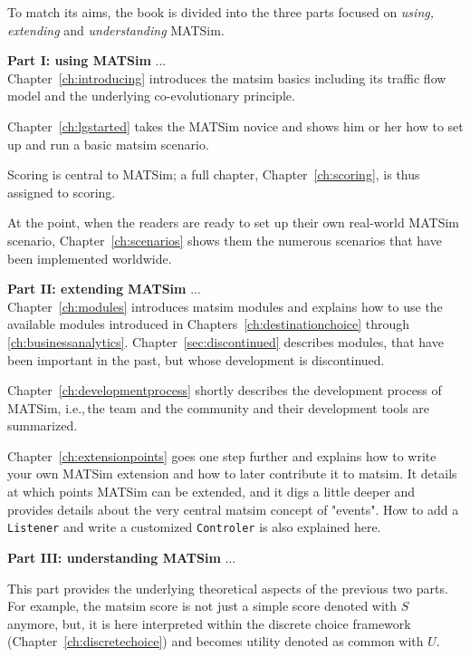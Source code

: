 To match its aims, the book is divided into the three parts focused on \emph{using, extending} and \emph{understanding} MATSim. 

\textbf{Part I: using MATSim} ... \\
Chapter~\ref{ch:introducing} introduces the \gls{matsim} basics including its traffic flow model and the underlying co-evolutionary principle. 

Chapter~\ref{ch:lgstarted} takes the MATSim novice and shows him or her how to set up and run a basic \gls{matsim} scenario. 

Scoring is central to MATSim; a full chapter, Chapter~\ref{ch:scoring}, is thus assigned to scoring. 

At the point, when the readers are ready to set up their own real-world MATSim \gls{scenario}, Chapter~\ref{ch:scenarios} shows them the numerous scenarios that have been implemented worldwide. 

\textbf{Part II: extending MATSim} ... \\
Chapter~\ref{ch:modules} introduces \gls{matsim} modules and explains how to use the available modules introduced in Chapters~\ref{ch:destinationchoice} through \ref{ch:businessanalytics}. Chapter~\ref{sec:discontinued} describes modules, that have been important in the past, but whose development is discontinued.

Chapter~\ref{ch:developmentprocess} shortly describes the development process of MATSim, i.e.,\,the team and the community and their development tools are summarized. 

Chapter~\ref{ch:extensionpoints} goes one step further and explains how to write your own MATSim extension and how to later contribute it to \gls{matsim}. It details at which points MATSim can be extended, and it digs a little deeper and provides details about the very central \gls{matsim} concept of "events". How to add a \lstinline|Listener| and write a customized \lstinline|Controler| is also explained here.

\textbf{Part III: understanding MATSim} ... \\


This part provides the underlying theoretical aspects of the previous two parts. For example, the \gls{matsim} score is not just a simple score denoted with $S$ anymore, but, it is here interpreted within the discrete choice framework (Chapter~\ref{ch:discretechoice}) and becomes utility denoted as common with $U$. 

